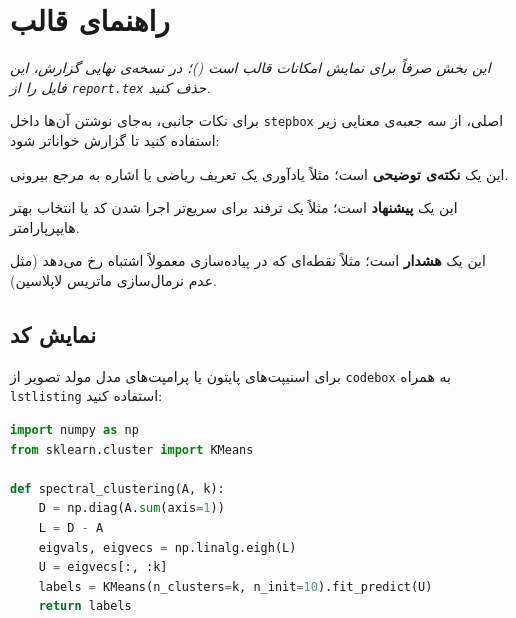 \section[راهنمای قالب]{راهنمای قالب}

\textit{\small این بخش صرفاً برای نمایش امکانات قالب است ()؛ در نسخه‌ی نهایی گزارش، این فایل را از \texttt{report.tex} حذف کنید.}

\vspace{0.4cm}
\begin{stepbox}
\end{stepbox}

\vspace{0.5cm}
\noindent برای نکات جانبی، به‌جای نوشتن آن‌ها داخل \texttt{stepbox} اصلی، از سه جعبه‌ی معنایی زیر استفاده کنید تا گزارش خواناتر شود:

\begin{notebox}
این یک \textbf{نکته‌ی توضیحی} است؛ مثلاً یادآوری یک تعریف ریاضی یا اشاره به مرجع بیرونی.
\end{notebox}

\begin{tipbox}
این یک \textbf{پیشنهاد} است؛ مثلاً یک ترفند برای سریع‌تر اجرا شدن کد یا انتخاب بهتر هایپرپارامتر.
\end{tipbox}

\begin{warnbox}
این یک \textbf{هشدار} است؛ مثلاً نقطه‌ای که در پیاده‌سازی معمولاً اشتباه رخ می‌دهد (مثل عدم نرمال‌سازی ماتریس لاپلاسین).
\end{warnbox}

\subsection{نمایش کد}
برای اسنیپت‌های پایتون یا پرامپت‌های مدل مولد تصویر از \texttt{codebox} به همراه \texttt{lstlisting} استفاده کنید:

\begin{codebox}
\begin{lstlisting}[language=Python]
import numpy as np
from sklearn.cluster import KMeans

def spectral_clustering(A, k):
    D = np.diag(A.sum(axis=1))
    L = D - A
    eigvals, eigvecs = np.linalg.eigh(L)
    U = eigvecs[:, :k]
    labels = KMeans(n_clusters=k, n_init=10).fit_predict(U)
    return labels
\end{lstlisting}
\end{codebox}


